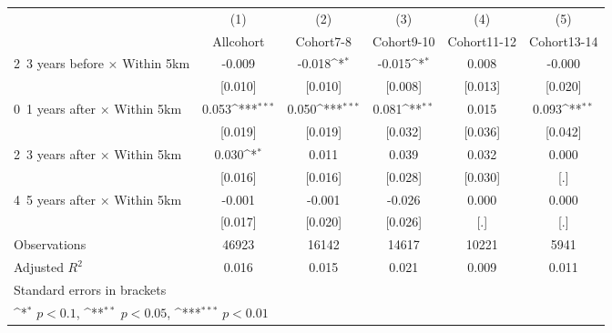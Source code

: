 {
\def\sym#1{\ifmmode^{#1}\else\(^{#1}\)\fi}
\begin{tabular}{l*{5}{c}}
\hline\hline
                    &\multicolumn{1}{c}{(1)}&\multicolumn{1}{c}{(2)}&\multicolumn{1}{c}{(3)}&\multicolumn{1}{c}{(4)}&\multicolumn{1}{c}{(5)}\\
                    &\multicolumn{1}{c}{Allcohort}&\multicolumn{1}{c}{Cohort7-8}&\multicolumn{1}{c}{Cohort9-10}&\multicolumn{1}{c}{Cohort11-12}&\multicolumn{1}{c}{Cohort13-14}\\
\hline
2~3 years before × Within 5km&      -0.009         &      -0.018\sym{*}  &      -0.015\sym{*}  &       0.008         &      -0.000         \\
                    &     [0.010]         &     [0.010]         &     [0.008]         &     [0.013]         &     [0.020]         \\
0~1 years after × Within 5km&       0.053\sym{***}&       0.050\sym{***}&       0.081\sym{**} &       0.015         &       0.093\sym{**} \\
                    &     [0.019]         &     [0.019]         &     [0.032]         &     [0.036]         &     [0.042]         \\
2~3 years after × Within 5km&       0.030\sym{*}  &       0.011         &       0.039         &       0.032         &       0.000         \\
                    &     [0.016]         &     [0.016]         &     [0.028]         &     [0.030]         &         [.]         \\
4~5 years after × Within 5km&      -0.001         &      -0.001         &      -0.026         &       0.000         &       0.000         \\
                    &     [0.017]         &     [0.020]         &     [0.026]         &         [.]         &         [.]         \\
\hline
Observations        &       46923         &       16142         &       14617         &       10221         &        5941         \\
Adjusted \(R^{2}\)  &       0.016         &       0.015         &       0.021         &       0.009         &       0.011         \\
\hline\hline
\multicolumn{6}{l}{\footnotesize Standard errors in brackets}\\
\multicolumn{6}{l}{\footnotesize \sym{*} \(p<0.1\), \sym{**} \(p<0.05\), \sym{***} \(p<0.01\)}\\
\end{tabular}
}

